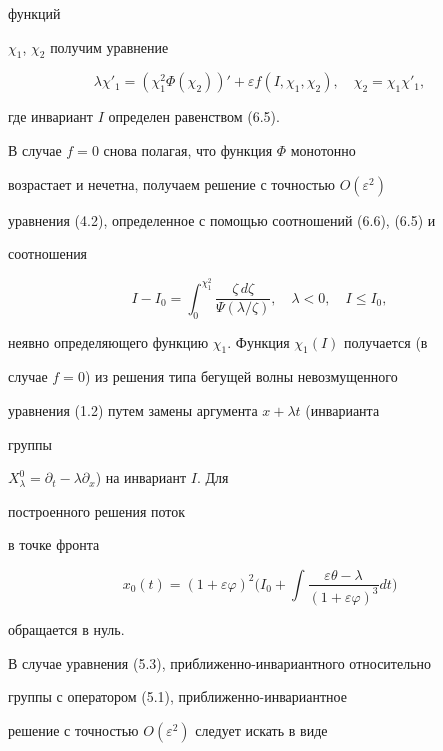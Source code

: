 функций 


$\chi_1$, $\chi_2$ получим уравнение 


$$ 


\lambda\chi'_1=(\chi^2_1\Phi(\chi_2))'+\varepsilon 


f(I,\chi_1,\chi_2),\quad 


\chi_2=\chi_1\chi'_1, 


$$ 


где инвариант $I$ определен равенством (6.5). 


 


В случае $f=0$ снова полагая, что функция $\Phi$ монотонно 


возрастает и нечетна, получаем решение с точностью $O(\varepsilon^2)$ 


уравнения (4.2), определенное с помощью соотношений (6.6), (6.5) и 


соотношения 


$$ 


I-I_0=\int^{\chi^2_1}_0\frac{\zeta\,d\zeta} 


{\Psi(\lambda/\zeta)},\quad \lambda<0,\quad I\le I_0, 


$$ 


неявно определяющего функцию $\chi_1$. Функция $\chi_1(I)$ получается (в 


случае $f=0$) из решения типа бегущей волны невозмущенного 


уравнения (1.2) путем замены аргумента $x+\lambda{}t$ (инварианта 


группы 


$X^0_\lambda=\partial_t-\lambda\partial_x$) на инвариант $I$. Для 


построенного решения поток 


в точке фронта 


$$


x_0(t)=(1+\varepsilon\varphi)^2\bigg(I_0+\int 


\frac{\varepsilon\theta-\lambda}{(1+\varepsilon\varphi)^3}dt\bigg) 


$$


обращается в нуль. 


 


В случае уравнения (5.3), приближенно-инвариантного относительно 


группы с оператором (5.1), приближенно-инвариантное 


решение с точностью $O(\varepsilon^2)$ следует искать в виде 


